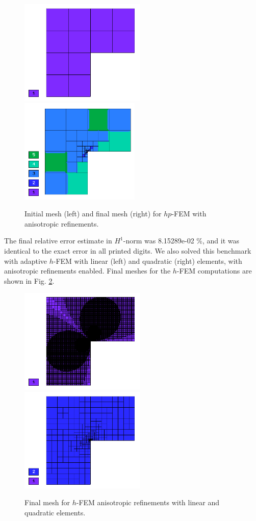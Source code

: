 \begin{figure}[!ht]
\centering
\includegraphics[height=5cm]{nist/nist-2/mesh_hp_aniso_init.png}\ \
\includegraphics[height=5cm]{nist/nist-2/mesh_hp_aniso.png}
\vspace{-2mm}
\caption{Initial mesh (left) and final mesh (right) for $hp$-FEM with anisotropic refinements.}
\label{fig:nist-2-hp-aniso}
\end{figure}

The final relative error estimate in $H^1$-norm was 8.15289e-02 \%,
and it was identical to the exact error in all printed digits.
We also solved this benchmark with adaptive $h$-FEM
with linear (left) and quadratic (right)
elements, with anisotropic refinements enabled.
Final meshes for the $h$-FEM computations are shown
in Fig. \ref{fig:nist-2-h-aniso}.

\begin{figure}[!ht]
\centering
\includegraphics[height=5cm]{nist/nist-2/mesh_h1_aniso.png}\ \
\includegraphics[height=5cm]{nist/nist-2/mesh_h2_aniso.png}
\vspace{-2mm}
\caption{Final mesh for $h$-FEM anisotropic refinements with linear and quadratic elements.}
\label{fig:nist-2-h-aniso}
\end{figure}

